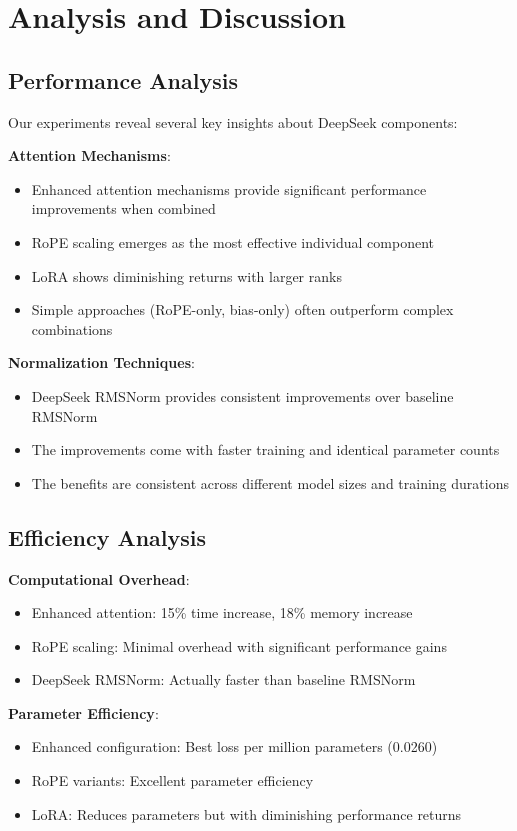 \documentclass[11pt,a4paper]{article}
\begin{document}
\section{Analysis and Discussion}

\subsection{Performance Analysis}

Our experiments reveal several key insights about DeepSeek components:

\textbf{Attention Mechanisms}:
\begin{itemize}
    \item Enhanced attention mechanisms provide significant performance improvements when combined
    \item RoPE scaling emerges as the most effective individual component
    \item LoRA shows diminishing returns with larger ranks
    \item Simple approaches (RoPE-only, bias-only) often outperform complex combinations
\end{itemize}

\textbf{Normalization Techniques}:
\begin{itemize}
    \item DeepSeek RMSNorm provides consistent improvements over baseline RMSNorm
    \item The improvements come with faster training and identical parameter counts
    \item The benefits are consistent across different model sizes and training durations
\end{itemize}

\subsection{Efficiency Analysis}

\textbf{Computational Overhead}:
\begin{itemize}
    \item Enhanced attention: 15\% time increase, 18\% memory increase
    \item RoPE scaling: Minimal overhead with significant performance gains
    \item DeepSeek RMSNorm: Actually faster than baseline RMSNorm
\end{itemize}

\textbf{Parameter Efficiency}:
\begin{itemize}
    \item Enhanced configuration: Best loss per million parameters (0.0260)
    \item RoPE variants: Excellent parameter efficiency
    \item LoRA: Reduces parameters but with diminishing performance returns
\end{itemize}
\end{document}
